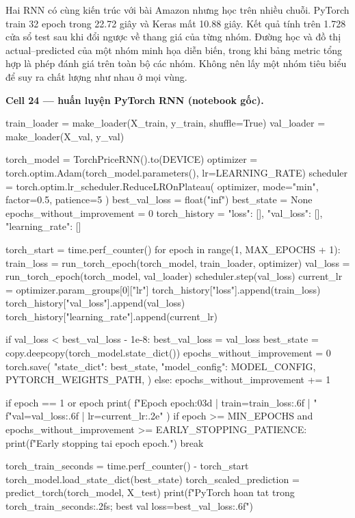 \documentclass[12pt,a4paper]{report}
\begin{document}
Hai RNN có cùng kiến trúc với bài Amazon nhưng học trên nhiều chuỗi. PyTorch train 32 epoch trong 22.72 giây và Keras mất 10.88 giây. Kết quả tính trên 1.728 cửa sổ test sau khi đổi ngược về thang giá của từng nhóm. Đường học và đồ thị actual--predicted của một nhóm minh họa diễn biến, trong khi bảng metric tổng hợp là phép đánh giá trên toàn bộ các nhóm. Không nên lấy một nhóm tiêu biểu để suy ra chất lượng như nhau ở mọi vùng.

\par\medskip\noindent\textbf{Cell 24 --- huấn luyện PyTorch RNN (notebook gốc).}
\begin{NotebookCode}
train_loader = make_loader(X_train, y_train, shuffle=True)
val_loader = make_loader(X_val, y_val)

torch_model = TorchPriceRNN().to(DEVICE)
optimizer = torch.optim.Adam(torch_model.parameters(), lr=LEARNING_RATE)
scheduler = torch.optim.lr_scheduler.ReduceLROnPlateau(
    optimizer, mode="min", factor=0.5, patience=5
)
best_val_loss = float("inf")
best_state = None
epochs_without_improvement = 0
torch_history = {"loss": [], "val_loss": [], "learning_rate": []}

torch_start = time.perf_counter()
for epoch in range(1, MAX_EPOCHS + 1):
    train_loss = run_torch_epoch(torch_model, train_loader, optimizer)
    val_loss = run_torch_epoch(torch_model, val_loader)
    scheduler.step(val_loss)
    current_lr = optimizer.param_groups[0]["lr"]
    torch_history["loss"].append(train_loss)
    torch_history["val_loss"].append(val_loss)
    torch_history["learning_rate"].append(current_lr)

    if val_loss < best_val_loss - 1e-8:
        best_val_loss = val_loss
        best_state = copy.deepcopy(torch_model.state_dict())
        epochs_without_improvement = 0
        torch.save(
            {"state_dict": best_state, "model_config": MODEL_CONFIG},
            PYTORCH_WEIGHTS_PATH,
        )
    else:
        epochs_without_improvement += 1

    if epoch == 1 or epoch %
        print(
            f"Epoch {epoch:03d} | train={train_loss:.6f} | "
            f"val={val_loss:.6f} | lr={current_lr:.2e}"
        )
    if epoch >= MIN_EPOCHS and epochs_without_improvement >= EARLY_STOPPING_PATIENCE:
        print(f"Early stopping tai epoch {epoch}.")
        break

torch_train_seconds = time.perf_counter() - torch_start
torch_model.load_state_dict(best_state)
torch_scaled_prediction = predict_torch(torch_model, X_test)
print(f"PyTorch hoan tat trong {torch_train_seconds:.2f}s; best val loss={best_val_loss:.6f}")
\end{NotebookCode}
\end{document}
